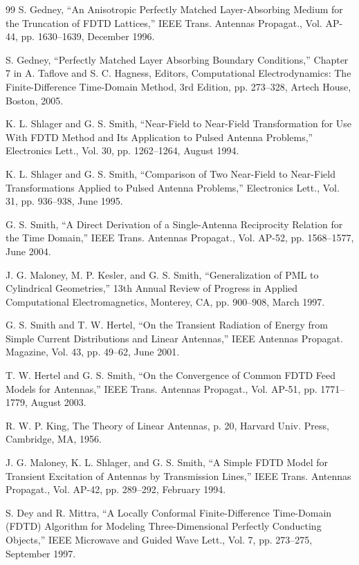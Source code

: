 \begin{thebibliography}{99}
 S. Gedney, ``An Anisotropic Perfectly Matched Layer-Absorbing Medium for the Truncation of FDTD Lattices,'' IEEE Trans. Antennas Propagat., Vol. AP-44, pp. 1630--1639, December 1996.

 S. Gedney, ``Perfectly Matched Layer Absorbing Boundary Conditions,'' Chapter 7 in A. Taflove and S. C. Hagness, Editors, Computational Electrodynamics: The Finite-Difference Time-Domain Method, 3rd Edition, pp. 273--328, Artech House, Boston, 2005.

 K. L. Shlager and G. S. Smith, ``Near-Field to Near-Field Transformation for Use With FDTD Method and Its Application to Pulsed Antenna Problems,'' Electronics Lett., Vol. 30, pp. 1262--1264, August 1994.

 K. L. Shlager and G. S. Smith, ``Comparison of Two Near-Field to Near-Field Transformations Applied to Pulsed Antenna Problems,'' Electronics Lett., Vol. 31, pp. 936--938, June 1995.

 G. S. Smith, ``A Direct Derivation of a Single-Antenna Reciprocity Relation for the Time Domain,'' IEEE Trans. Antennas Propagat., Vol. AP-52, pp. 1568--1577, June 2004.

 J. G. Maloney, M. P. Kesler, and G. S. Smith, ``Generalization of PML to Cylindrical Geometries,'' 13th Annual Review of Progress in Applied Computational Electromagnetics, Monterey, CA, pp. 900--908, March 1997.

 G. S. Smith and T. W. Hertel, ``On the Transient Radiation of Energy from Simple Current Distributions and Linear Antennas,'' IEEE Antennas Propagat. Magazine, Vol. 43, pp. 49--62, June 2001.

 T. W. Hertel and G. S. Smith, ``On the Convergence of Common FDTD Feed Models for Antennas,'' IEEE Trans. Antennas Propagat., Vol. AP-51, pp. 1771--1779, August 2003.

 R. W. P. King, The Theory of Linear Antennas, p. 20, Harvard Univ. Press, Cambridge, MA, 1956.

 J. G. Maloney, K. L. Shlager, and G. S. Smith, ``A Simple FDTD Model for Transient Excitation of Antennas by Transmission Lines,'' IEEE Trans. Antennas Propagat., Vol. AP-42, pp. 289--292, February 1994.

 S. Dey and R. Mittra, ``A Locally Conformal Finite-Difference Time-Domain (FDTD) Algorithm for Modeling Three-Dimensional Perfectly Conducting Objects,'' IEEE Microwave and Guided Wave Lett., Vol. 7, pp. 273--275, September 1997.


\end{thebibliography}
